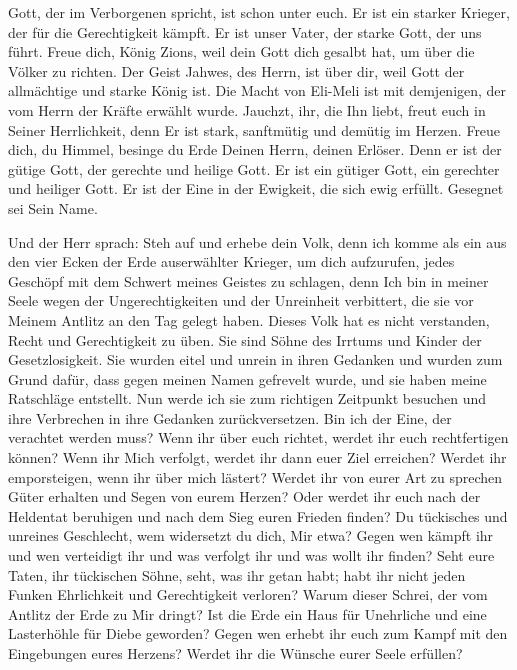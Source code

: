         Gott, der im Verborgenen spricht, ist schon unter euch. Er ist ein starker Krieger, der für die Gerechtigkeit kämpft. Er ist unser Vater, der starke Gott, der uns führt. Freue dich, König Zions, weil dein Gott dich gesalbt hat, um über die Völker zu richten. Der Geist Jahwes, des Herrn, ist über dir, weil Gott der allmächtige und starke König ist. Die Macht von Eli-Meli ist mit demjenigen, der vom Herrn der Kräfte erwählt wurde. Jauchzt, ihr, die Ihn liebt, freut euch in Seiner Herrlichkeit, denn Er ist stark, sanftmütig und demütig im Herzen. Freue dich, du Himmel, besinge du Erde Deinen Herrn, deinen Erlöser. Denn er ist der gütige Gott, der gerechte und heilige Gott. Er ist ein gütiger Gott, ein gerechter und heiliger Gott. Er ist der Eine in der Ewigkeit, die sich ewig erfüllt. Gesegnet sei Sein Name.
        
        Und der Herr sprach: Steh auf und erhebe dein Volk, denn ich komme als ein aus den vier Ecken der Erde auserwählter Krieger, um dich aufzurufen, jedes Geschöpf mit dem Schwert meines Geistes zu schlagen, denn Ich bin in meiner Seele wegen der Ungerechtigkeiten und der Unreinheit verbittert, die sie vor Meinem Antlitz an den Tag gelegt haben. Dieses Volk hat es nicht verstanden, Recht und Gerechtigkeit zu üben. Sie sind Söhne des Irrtums und Kinder der Gesetzlosigkeit. Sie wurden eitel und unrein in ihren Gedanken und wurden zum Grund dafür, dass gegen meinen Namen gefrevelt wurde, und sie haben meine Ratschläge entstellt. Nun werde ich sie zum richtigen Zeitpunkt besuchen und ihre Verbrechen in ihre Gedanken zurückversetzen. Bin ich der Eine, der verachtet werden muss? Wenn ihr über euch richtet, werdet ihr euch rechtfertigen können? Wenn ihr Mich verfolgt, werdet ihr dann euer Ziel erreichen? Werdet ihr emporsteigen, wenn ihr über mich lästert? Werdet ihr von eurer Art zu sprechen Güter erhalten und Segen von eurem Herzen? Oder werdet ihr euch nach der Heldentat beruhigen und nach dem Sieg euren Frieden finden? Du tückisches und unreines Geschlecht, wem widersetzt du dich, Mir etwa? Gegen wen kämpft ihr und wen verteidigt ihr und was verfolgt ihr und was wollt ihr finden? Seht eure Taten, ihr tückischen Söhne, seht, was ihr getan habt; habt ihr nicht jeden Funken Ehrlichkeit und Gerechtigkeit verloren? Warum dieser Schrei, der vom Antlitz der Erde zu Mir dringt? Ist die Erde ein Haus für Unehrliche und eine Lasterhöhle für Diebe geworden? Gegen wen erhebt ihr euch zum Kampf mit den Eingebungen eures Herzens? Werdet ihr die Wünsche eurer Seele erfüllen? 
        
